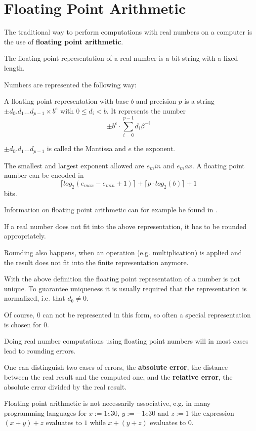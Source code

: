 \section{Floating Point Arithmetic}
The traditional way to perform computations with real numbers on a computer is the use 
of \textbf{floating point arithmetic}. 

The floating point representation of a real number is a bit-string with a fixed
length.

Numbers are represented the following way:
\begin{definition}\label{def: floating point number}
	A floating point representation with base $b$ and precision $p$
	is a string $\pm d_0 . d_1 \dots d_{p-1} \times b^e$ with $0 \leq d_i < b$.	
	It represents the number
	$$ \pm b^e \cdot \sum_{i=0}^{p-1} d_i\beta^{-i} $$ 

	$\pm d_0 . d_1 \dots d_{p-1}$ is called the Mantissa and $e$ the exponent.
	
	The smallest and largest exponent allowed are $e_min$ and $e_max$.
	A floating point number can be encoded in
	$$ \lceil log_2(e_{max}-e_{min}+1) \rceil + \lceil  p \cdot log_2 (b) \rceil + 1 $$
	bits.
\end{definition}

Information on floating point arithmetic can for example be found in
\cite{Goldberg1991}.

If a real number does not fit into the above representation, it has to be
rounded appropriately.

Rounding also happens, when an operation (e.g. multiplication) is applied and
the result does not fit into the finite representation anymore.

With the above definition the floating point representation of a number is not
unique. 
To guarantee uniqueness it is usually required that the representation  is
normalized, i.e. that $d_0 \neq 0$. 

Of course, $0$ can not be represented in this form, so often a special
representation is chosen for $0$.

Doing real number computations using floating point numbers will in most cases
lead to rounding errors.

One can distinguish two cases of errors, the \textbf{absolute error}, the
distance between the real result and the computed one, and the \textbf{relative
error}, the absolute error divided by the real result.

Floating point arithmetic is not necessarily associative, e.g. in many
programming languages for $x := 1e30$, $y := -1e30$ and $z := 1$ the expression
$(x+y)+z$ evaluates to $1$ while $x+(y+z)$ evaluates to $0$.

